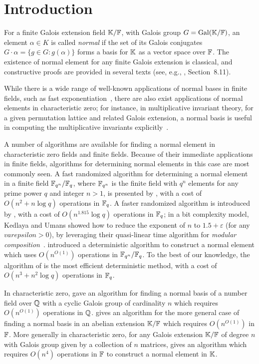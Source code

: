 \section{Introduction}

For a finite Galois extension field $\mathbb{K}/\mathbb{F}$, with Galois group $G =
\mathrm{Gal}(\mathbb{K}/\mathbb{F})$, an element $\alpha \in K$ is called
\emph{normal} if the set of its Galois conjugates $G \cdot \alpha =
\{g\in G: g(\alpha)\}$ forms a basis for $\mathbb{K}$ as a vector space over
$\mathbb{F}$. The existence of normal element for any finite Galois extension
is classical, and constructive proofs are provided in several texts
(see, e.g., \cite{Wae70}, Section~8.11).
 
While there is a wide range of well-known applications of normal
bases in finite fields, such as fast
exponentiation~\cite{GaGaPaSh00}, there are also exist applications of
normal elements in characteristic zero; for instance, in
multiplicative invariant theory, for a given permutation lattice and
related Galois extension, a normal basis is useful in computing the
multiplicative invariants explicitly~\cite{Armin}.

A number of algorithms are available for finding a normal element in
characteristic zero fields and finite fields.  Because of their
immediate applications in finite fields, algorithms for determining
normal elements in this case are most commonly seen.  A fast
randomized algorithm for determining a normal element in a finite
field $\mathbb{F}_{q^n}/\mathbb{F}_q$, where $\mathbb{F}_{q^n}$ is the finite field with
$q^n$ elements for any prime power $q$ and integer $n>1$, is presented
by , with a cost of $O(n^2+n\log q)$ operations in
$\mathbb{F}_q$.  A faster randomized algorithm is introduced by
, with a cost of $O(n^{1.815}\log q)$ operations in
$\mathbb{F}_q$; in a bit complexity model, Kedlaya and Umans showed how to
reduce the exponent of $n$ to $1.5+\varepsilon$ (for any $varepsilon >
0$), by leveraging their quasi-linear time algorithm for {\em modular
  composition}~\cite{KeUm11}.  introduced a
deterministic algorithm to construct a normal element which uses
$O(n^{O(1)})$ operations in $\mathbb{F}_{q^n}/\mathbb{F}_q$.  To the best of our
knowledge, the algorithm of  is the most efficient
deterministic method, with a cost of $O(n^3+n^2\log q)$ operations in
$\mathbb{F}_q$.

In characteristic zero,  gave an algorithm for finding
a normal basis of a number field over $\mathbb{Q}$ with a cyclic Galois group
of cardinality $n$ which requires $O(n^{O(1)})$ operations in $\mathbb{Q}$.
 gives an algorithm for the more general case of finding
a normal basis in an abelian extension $\mathbb{K}/\mathbb{F}$ which requires
$O(n^{O(1)})$ in $\mathbb{F}$.  More generally in characteristic zero, for any
Galois extension $\mathbb{K}/\mathbb{F}$ of degree $n$ with Galois group given by a
collection of $n$ matrices,  gives an algorithm which
requires $O(n^4)$ operations in $\mathbb{F}$ to construct a normal element in
$\mathbb{K}$.

